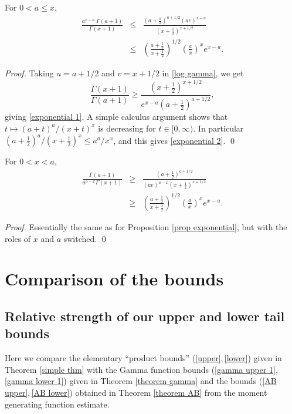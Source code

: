 \documentclass[smallextended,envcountsect]{svjour3}
\begin{document}
\begin{proposition} \label{prop exponential} For $0 < a \le x$,
\begin{eqnarray}
\frac{a^{x-a} \ \Gamma(a+1)}{\Gamma(x+1)} & \le & \frac{\left(a+\frac{1}{2}\right)^{a+1/2}(ae)^{x-a}}{\left(x+\frac{1}{2}\right)^{x+1/2}} \label{exponential 1}\\
    & \le & \left(\frac{a+\frac{1}{2}}{x+\frac{1}{2}}\right)^{1/2} \left(\frac{a}{x}\right)^x e^{x-a}. \label{exponential 2}
\end{eqnarray}
\end{proposition}

\begin{proof}  Taking $u = a+1/2$ and $v=x+1/2$ in \eqref{log gamma}, we get
  $$ \frac{\Gamma(x+1)}{\Gamma(a+1)} \ge \frac{(x+\frac{1}{2})^{x+1/2}}{e^{x-a}(a+\frac{1}{2})^{a+1/2}},
  $$
giving \eqref{exponential 1}.   A simple calculus argument shows that $t \mapsto  (a+t)^a/(x+t)^x$ is decreasing for $t \in[0,\infty)$.  In particular $\left(a+\frac{1}{2}\right)^a/\left(x+\frac{1}{2}\right)^x \le a^a/x^x$, and this gives \eqref{exponential 2}.
 \qed \end{proof}

\begin{proposition} \label{prop lower exponential} For $0 < x <a$,
\begin{eqnarray}
\frac{\Gamma(a+1)}{a^{a-x} \Gamma(x+1)} & \ge & \frac{\left(a+\frac{1}{2}\right)^{a+1/2}}{(ae)^{a-x}\left(x+\frac{1}{2}\right)^{x+1/2}} \label{lower exponential 1}\\
    & \ge & \left(\frac{a+\frac{1}{2}}{x+\frac{1}{2}}\right)^{1/2} \left(\frac{a}{x}\right)^x e^{x-a}. \label{lower exponential 2}
\end{eqnarray}
\end{proposition}

\begin{proof}  Essentially the same as for Proposition \ref{prop exponential}, but with the roles of $x$ and $a$ switched.
 \qed \end{proof}

\section{Comparison of the bounds} \label{sect comparison}

\subsection{Relative strength of our upper and lower tail bounds} Here we compare the elementary ``product bounds'' (\ref{upper},\,\ref{lower}) given in Theorem \ref{simple thm} with the Gamma function bounds (\ref{gamma upper 1},\,\ref{gamma lower 1}) given in Theorem \ref{theorem gamma} and the bounds (\ref{AB upper},\,\ref{AB lower}) obtained in Theorem \ref{theorem AB} from the moment generating function estimate.
\end{document}
